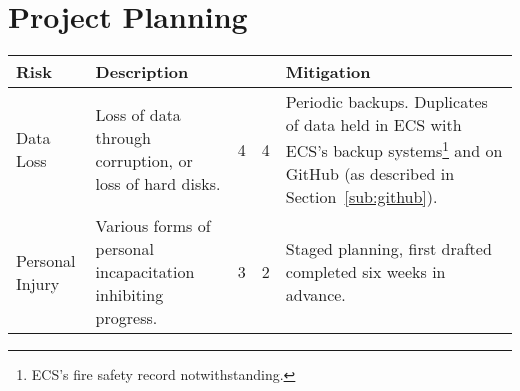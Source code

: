 \chapter{Project Planning}

\begin{landscape}
\begin{tabu} to 0.9\linewidth { X[3,r] | X[7,l] | X[c] | X[c] | X[7,l] }
Risk & Description &  &  & Mitigation \\ \hline
Data Loss &
  Loss of data through corruption, or loss of hard disks. &
  4 & 4 &
  Periodic backups. Duplicates of data held in ECS with ECS's backup systems\footnote{ECS's fire safety record notwithstanding.} and on GitHub (as described in Section~\ref{sub:github}). \\
Personal Injury &
  Various forms of personal incapacitation inhibiting progress. &
  3 & 2 &
  Staged planning, first drafted completed six weeks in advance. \\
\end{tabu}
\end{landscape}

